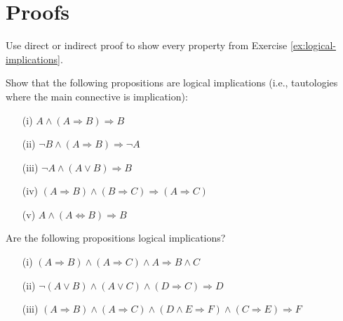 \documentclass[11pt,paper=b5,footinclude,headinclude]{scrbook} %
\theoremstyle{remark}
\theoremstyle{definition} %
\theoremstyle{theorem} %
\newtheorem{ex}{Exercise\hypertarget{sol:\theex}}[chapter]
\begin{document}
\section{Proofs}
\begin{ex}
    Use direct or indirect proof to show every property from Exercise \ref{ex:logical-implications}. 
\end{ex}
    \begin{ex} Show that the following propositions are logical implications (i.e., tautologies where the main connective is implication):
        \begin{itemize}
            \item[(i)] $A \land (A \Rightarrow B) \Rightarrow B$
            \item[(ii)] $\neg B \land (A \Rightarrow B) \Rightarrow \neg A$
            \item[(iii)] $\neg A \land (A \lor B) \Rightarrow B$
            \item[(iv)] $(A \Rightarrow B) \land (B \Rightarrow C) \Rightarrow (A \Rightarrow C)$
            \item[(v)] $A \land (A \Leftrightarrow B) \Rightarrow B$
        \end{itemize}
    \end{ex} 
    \begin{ex} Are the following propositions logical implications?
\begin{itemize}
    \item[(i)] $(A \Rightarrow B) \land (A \Rightarrow C) \land A \Rightarrow B \land C$
    \item[(ii)] $\neg(A \lor B) \land (A \lor C) \land (D \Rightarrow C) \Rightarrow D$
    \item[(iii)] $(A \Rightarrow B) \land (A \Rightarrow C) \land (D \land E \Rightarrow F) \land (C \Rightarrow E) \Rightarrow F$
\end{itemize}
\end{ex}
\end{document}
